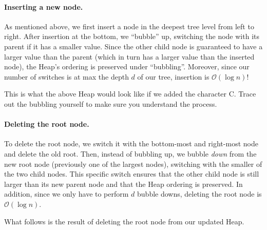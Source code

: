 \documentclass[10pt]{article}
\begin{document}
\paragraph{Inserting a new node.}
As mentioned above, we first insert a node in the deepest tree level from left to right.
After insertion at the bottom, we ``bubble'' up, switching the node with its
parent if it has a smaller value.
Since the other child node is guaranteed to have a larger value than the
parent (which in turn has a larger value than the inserted node),
the Heap's ordering is preserved under ``bubbling''.
Moreover, since our number of switches is at max the depth $d$ of our tree,
insertion is $\mathcal{O}(\log{}n)$!

This is what the above Heap would look like if we added the character C.
Trace out the bubbling yourself to make sure you understand the process.
\begin{center}
\end{center}

\paragraph{Deleting the root node.}
To delete the root node, we switch it with the bottom-most and right-most node
and delete the old root.
Then, instead of bubbling up, we bubble \textit{down} from the new root node (previously
one of the largest nodes),
switching with the smaller of the two child nodes.
This specific switch ensures that the other child node is still larger
than its new parent node and that the Heap ordering is preserved.
In addition, since we only have to perform $d$ bubble downs,
deleting the root node is $\mathcal{O}(\log{}n)$.

What follows is the result of deleting the root node from our updated Heap.
\begin{center}
\end{center}
\end{document}

